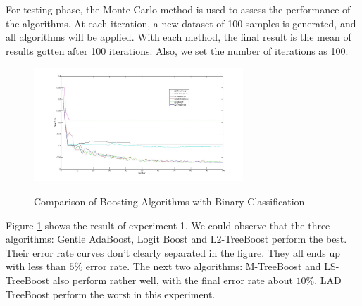 \documentclass[a4paper,twoside,12pt]{article}
\begin{document}
For testing phase, the Monte Carlo method is used to assess the performance of the algorithms. At each iteration, a new dataset of 100 samples is generated, and all algorithms will be applied. With each method, the final result is the mean of results gotten after 100 iterations. Also, we set the number of iterations as 100.
\begin{figure}[H]
\centering
\caption{Comparison of Boosting Algorithms with Binary Classification}
\includegraphics[width = 0.7\textwidth]{Figures/bin_class_comparison}
\label{fig:bin_class_comparison}
\end{figure}
Figure \ref{fig:bin_class_comparison} shows the result of experiment 1. We could observe that the three algorithms: Gentle AdaBoost, Logit Boost and L2-TreeBoost perform the best. Their error rate curves don't clearly separated in the figure. They all ends up with less than $5\%$ error rate. The next two algorithms: M-TreeBoost and LS-TreeBoost also perform rather well, with the final error rate about $10\%$.  LAD TreeBoost perform the worst in this experiment.
\end{document}
